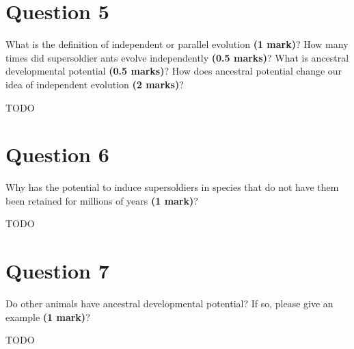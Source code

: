 \documentclass[letterpaper,12pt]{article}
\newenvironment{myindentpar}[1]%
{\begin{list}{}%
          {\setlength{\leftmargin}{#1}}%
          \item[]%
}
{\end{list}}
\begin{document}
\section{Question 5}

What is the definition of independent or parallel evolution \textbf{(1 mark)}? How many times did supersoldier ants evolve independently \textbf{(0.5 marks)}? What is ancestral developmental potential \textbf{(0.5 marks)}? How does ancestral potential change our idea of independent evolution \textbf{(2 marks)}?
\vspace*{20px}

\begin{myindentpar}{0.5cm}
TODO
\end{myindentpar}


\section{Question 6}

Why has the potential to induce supersoldiers in species that do not have them been retained for millions of years \textbf{(1 mark)}?
\vspace*{20px}

\begin{myindentpar}{0.5cm}
TODO
\end{myindentpar}



\section{Question 7}

Do other animals have ancestral developmental potential? If so, please give an example \textbf{(1 mark)}?
\vspace*{20px}

\begin{myindentpar}{0.5cm}
TODO
\end{myindentpar}
\end{document}
